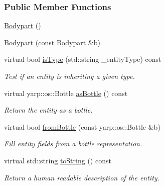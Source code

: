 \subsubsection*{Public Member Functions}
\begin{DoxyCompactItemize}
\item 
\hyperlink{group__icubclient__representations_a3eb671588904ac51120d9db3be131273}{Bodypart} ()
\item 
\hyperlink{group__icubclient__representations_aaed98e4908214ca9523e46557120743a}{Bodypart} (const \hyperlink{group__icubclient__representations_classicubclient_1_1Bodypart}{Bodypart} \&b)
\item 
virtual bool \hyperlink{group__icubclient__representations_a092e89cbeecc23d729be0423216a9920}{is\+Type} (std\+::string \+\_\+entity\+Type) const
\begin{DoxyCompactList}\small\item\em Test if an entity is inheriting a given type. \end{DoxyCompactList}\item 
virtual yarp\+::os\+::\+Bottle \hyperlink{group__icubclient__representations_acacf4d8971e54092fae9f3278f219562}{as\+Bottle} () const
\begin{DoxyCompactList}\small\item\em Return the entity as a bottle. \end{DoxyCompactList}\item 
virtual bool \hyperlink{group__icubclient__representations_a0d70a33efc69486a46e7f6a06abc5ff2}{from\+Bottle} (const yarp\+::os\+::\+Bottle \&b)
\begin{DoxyCompactList}\small\item\em Fill entity fields from a bottle representation. \end{DoxyCompactList}\item 
virtual std\+::string \hyperlink{group__icubclient__representations_ac14830acd5adc122c5caeb91947b9ca1}{to\+String} () const
\begin{DoxyCompactList}\small\item\em Return a human readable description of the entity. \end{DoxyCompactList}\end{DoxyCompactItemize}
